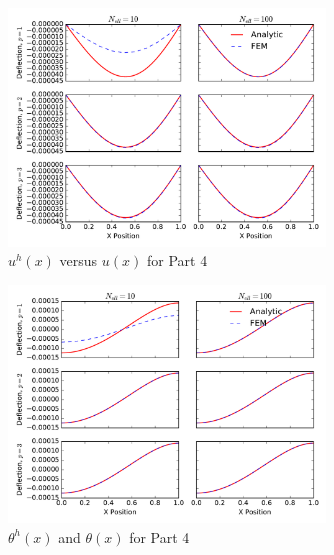 \documentclass{article}
\begin{document}
\begin{figure}[ht]
	\centering
	\includegraphics[width=0.75\textwidth]{beam1_deflection_prob4_dof0}
	\caption{$u^h(x)$ versus $u(x)$ for Part 4}
	\label{fig:41}
\end{figure}

\begin{figure}[ht]
	\centering
	\includegraphics[width=0.75\textwidth]{beam1_deflection_prob4_dof4}
	\caption{$\theta^h(x)$ and $\theta(x)$ for Part 4}
	\label{fig:42}
\end{figure}
\end{document}
